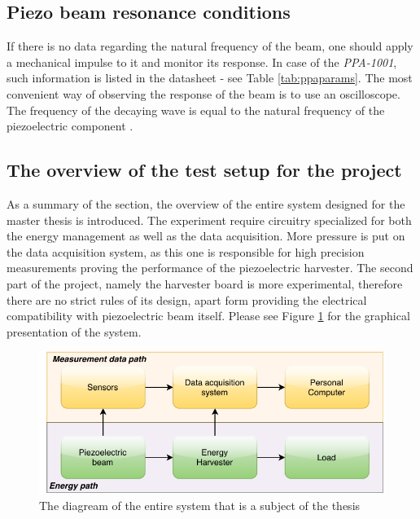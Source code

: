 \documentclass[12pt,a4paper]{article}
\begin{document}
\subsection{Piezo beam resonance conditions}

If there is no data regarding the natural frequency of the beam, one should apply a mechanical impulse to it and monitor its response. In case of the \textit{PPA-1001}, such information is listed in the datasheet - see Table \ref{tab:ppaparams}. The most convenient way of observing the response of the beam is to use an oscilloscope. The frequency of the decaying wave is equal to the natural frequency of the piezoelectric component \cite{PPA}.
\par

\subsection{The overview of the test setup for the project}

As a summary of the section, the overview of the entire system designed for the master thesis is introduced. The experiment require circuitry specialized for both the energy management as well as the data acquisition. More pressure is put on the data acquisition system, as this one is responsible for high precision measurements proving the performance of the piezoelectric harvester. The second part of the project, namely the harvester board is more experimental, therefore there are no strict rules of its design, apart form providing the electrical compatibility with piezoelectric beam itself. Please see Figure \ref{fig:system} for the graphical presentation of the system.

\begin{figure}[h!]
\includegraphics[scale=1.0]{system.pdf}
\caption{The diagream of the entire system that is a subject of the thesis}
\label{fig:system}
\end{figure}
\par
\end{document}
